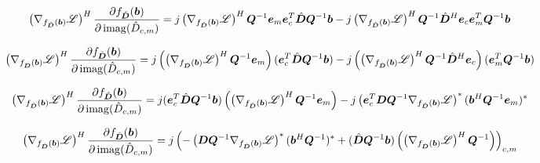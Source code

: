 \begin{appendices}
\begin{equation}
\left(\nabla_{f_{\hat{\bm{D}}}(\bm{b})} \mathscr{L}\right)^H\frac{\partial f_{\hat{\bm{D}}}(\bm{b})}{\partial \operatorname{imag}(\hat{D}_{c,m})} = j\left(\nabla_{f_{\hat{\bm{D}}}(\bm{b})} \mathscr{L}\right)^H\bm{Q}^{-1}\bm{e}_m\bm{e}_c^T\hat{\bm{D}}\bm{Q}^{-1}\bm{b} - j\left(\nabla_{f_{\hat{\bm{D}}}(\bm{b})} \mathscr{L}\right)^H\bm{Q}^{-1}\hat{\bm{D}}^H\bm{e}_c\bm{e}_m^T\bm{Q}^{-1}\bm{b}
\end{equation}

\begin{equation}
\left(\nabla_{f_{\hat{\bm{D}}}(\bm{b})} \mathscr{L}\right)^H\frac{\partial f_{\hat{\bm{D}}}(\bm{b})}{\partial \operatorname{imag}(\hat{D}_{c,m})} = j\left(\left(\nabla_{f_{\hat{\bm{D}}}(\bm{b})} \mathscr{L}\right)^H\bm{Q}^{-1}\bm{e}_m\right)(\bm{e}_c^T\hat{\bm{D}}\bm{Q}^{-1}\bm{b}) - j\left(\left(\nabla_{f_{\hat{\bm{D}}}(\bm{b})} \mathscr{L}\right)^H\bm{Q}^{-1}\hat{\bm{D}}^H\bm{e}_c\right)(\bm{e}_m^T\bm{Q}^{-1}\bm{b})
\end{equation}

\begin{equation}
\left(\nabla_{f_{\hat{\bm{D}}}(\bm{b})} \mathscr{L}\right)^H\frac{\partial f_{\hat{\bm{D}}}(\bm{b})}{\partial \operatorname{imag}(\hat{D}_{c,m})} = j(\bm{e}_c^T\hat{\bm{D}}\bm{Q}^{-1}\bm{b})\left(\left(\nabla_{f_{\hat{\bm{D}}}(\bm{b})} \mathscr{L}\right)^H\bm{Q}^{-1}\bm{e}_m\right) - j\left(\bm{e}_c^T\bm{D}\bm{Q}^{-1}\nabla_{f_{\hat{\bm{D}}}(\bm{b})} \mathscr{L}\right)^*(\bm{b}^H\bm{Q}^{-1}\bm{e}_m)^*
\end{equation}


\begin{equation}
\left(\nabla_{f_{\hat{\bm{D}}}(\bm{b})} \mathscr{L}\right)^H\frac{\partial f_{\hat{\bm{D}}}(\bm{b})}{\partial \operatorname{imag}(\hat{D}_{c,m})} = j\left(-\left(\bm{D}\bm{Q}^{-1}\nabla_{f_{\hat{\bm{D}}}(\bm{b})} \mathscr{L}\right)^*(\bm{b}^H\bm{Q}^{-1})^* + (\hat{\bm{D}}\bm{Q}^{-1}\bm{b})\left(\left(\nabla_{f_{\hat{\bm{D}}}(\bm{b})} \mathscr{L}\right)^H\bm{Q}^{-1}\right)\right)_{c,m}
\end{equation}




\end{appendices}
